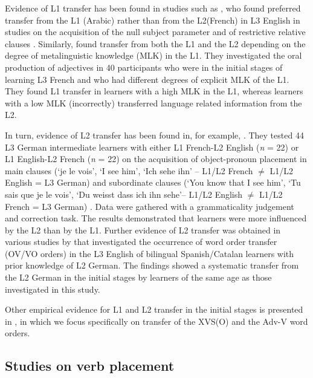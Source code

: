 \documentclass[output=paper]{langsci/langscibook}
\begin{document}
Evidence of L1 transfer has been found in studies such as \citet{Hermas2014Morphosyntax, Hermas2014Relatives}, who found preferred transfer from the L1 (Arabic) rather than from the L2\linebreak (French) in L3 English in studies on the acquisition of the null subject parameter \citep{Hermas2014Morphosyntax} and of restrictive relative clauses \citep{Hermas2014Relatives}. Similarly, \citet{FalkEtAl2015} found transfer from both the L1 and the L2 depending on the degree of metalinguistic knowledge (MLK) in the L1. They investigated the oral production of adjectives in 40 participants who were in the initial stages of learning L3 French and who had different degrees of explicit MLK of the L1. They found L1 transfer in learners with a high MLK in the L1, whereas learners with a low MLK (incorrectly) transferred language related information from the L2.

In turn, evidence of L2 transfer has been found in, for example, \citet{FalkBardel2011}. They tested 44 L3 German intermediate learners with either L1 French-L2 English (\textit{n} = 22) or L1 English-L2 French (\textit{n} = 22) on the acquisition of object-pronoun placement in main clauses (‘je {le} vois’, ‘I see {him}’, ‘Ich sehe {ihn’} – L1/L2 French ${\neq}$ L1/L2 English = L3 German) and subordinate clauses (‘You know that I see {him}’, ‘Tu sais que je {le} vois’, ‘Du weisst dass ich {ihn} sehe’– L1/L2 English ${\neq}$ L1/L2 French = L3 German) \citep[60]{FalkBardel2011}. Data were gathered with a grammaticality judgement and correction task. The results demonstrated that learners were more influenced by the L2 than by the L1. Further evidence of L2 transfer was obtained in various studies by \citet{Sánchez2012, Sánchez2015, Sánchez2016} that investigated the occurrence of word order transfer (OV/VO orders) in the L3 English of bilingual Spanish/Catalan learners with prior knowledge of L2 German. The findings showed a systematic transfer from the L2 German in the initial stages by learners of the same age as those investigated in this study.

Other empirical evidence for L1 and L2 transfer in the initial stages is presented in , in which we focus specifically on transfer of the XVS(O) and the Adv-V word orders.

\subsection{{Studies on verb} {placement} }%
\label{sec:stadt:2.2}
\end{document}
